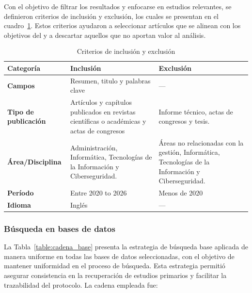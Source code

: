 \noindent
Con el objetivo de filtrar los resultados y enfocarse en estudios relevantes, se definieron criterios de inclusión y exclusión, los 
cuales se presentan en el cuadro~\ref{table:criterios-inclusion-exclusion}. Estos criterios ayudaron a seleccionar artículos que se 
alinean con los objetivos del \SMS y a descartar aquellos que no aportan valor al análisis.

\begin{table}[H]
	\centering
	
	\fontsize{9pt}{10pt}\selectfont %
	\begin{tabular}{|p{3cm}|p{5cm}|p{6cm}|}
	\hline
	\textbf{Categoría} & \textbf{Inclusión} & \textbf{Exclusión} \\
    \hline
    \textbf{Campos} & Resumen, titulo y palabras clave & --- \\
	\hline
    \textbf{Tipo de publicación} & Artículos y capítulos publicados en revistas científicas o académicas y actas de congresos & Informe técnico, actas de congresos y tesis. \\
    \hline
    \textbf{Área/Disciplina} & Administración, Informática, Tecnologías de la Información y Ciberseguridad. & Áreas no relacionadas con la gestión, Informática, Tecnologías de la Información y Ciberseguridad. \\
    \hline
    \textbf{Período} & Entre 2020 to 2026 & Menos de 2020 \\
    \hline
    \textbf{Idioma} & Inglés & --- \\
    \hline
    \end{tabular}
	\caption{Criterios de inclusión y exclusión}\label{table:criterios-inclusion-exclusion}
\end{table}


\subsubsection{Búsqueda en bases de datos}\label{par:busquedaBasesDatos}
\noindent
La Tabla~\ref{table:cadena_base} presenta la estrategia de búsqueda base aplicada de manera uniforme en todas las bases de datos 
seleccionadas, con el objetivo de mantener uniformidad en el proceso de búsqueda. Esta estrategia permitió asegurar consistencia en la recuperación de estudios primarios y facilitar 
la trazabilidad del protocolo. La cadena empleada fue:

